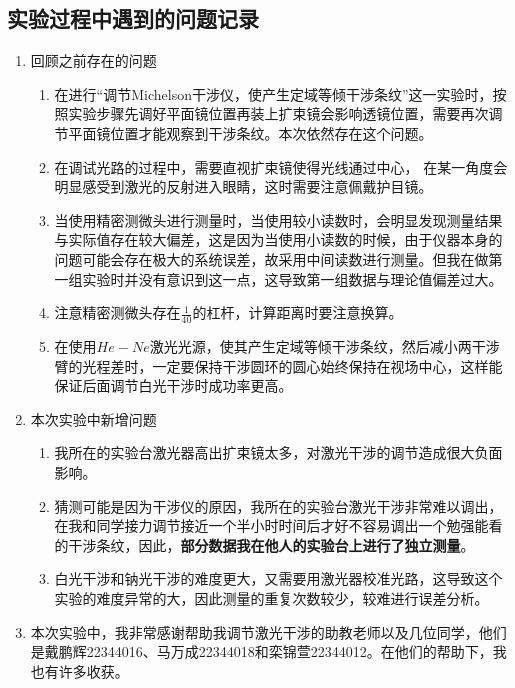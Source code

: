 \documentclass[dvipsnames, svgnames,a4paper,11pt]{article}
\begin{document}
	\subsection{实验过程中遇到的问题记录}
	\begin{enumerate}
		\item 回顾之前存在的问题
		\begin{enumerate}
			\item 在进行“调节Michelson干涉仪，使产生定域等倾干涉条纹”这一实验时，按照实验步骤先调好平面镜位置再装上扩束镜会影响透镜位置，需要再次调节平面镜位置才能观察到干涉条纹。本次依然存在这个问题。
			\item 在调试光路的过程中，需要直视扩束镜使得光线通过中心，
			在某一角度会明显感受到激光的反射进入眼睛，这时需要注意佩戴护目镜。
			\item 当使用精密测微头进行测量时，当使用较小读数时，会明显发现测量结果与实际值存在较大偏差，这是因为当使用小读数的时候，由于仪器本身的问题可能会存在极大的系统误差，故采用中间读数进行测量。但我在做第一组实验时并没有意识到这一点，这导致第一组数据与理论值偏差过大。
			\item 注意精密测微头存在$\frac{1}{40}$的杠杆，计算距离时要注意换算。			
			\item 在使用$He-Ne$激光光源，使其产生定域等倾干涉条纹，然后减小两干涉臂的光程差时，一定要保持干涉圆环的圆心始终保持在视场中心，这样能保证后面调节白光干涉时成功率更高。
		\end{enumerate}
		\item 本次实验中新增问题
		\begin{enumerate}
			\item 我所在的实验台激光器高出扩束镜太多，对激光干涉的调节造成很大负面影响。
			\item 猜测可能是因为干涉仪的原因，我所在的实验台激光干涉非常难以调出，在我和同学接力调节接近一个半小时时间后才好不容易调出一个勉强能看的干涉条纹，因此，\textbf{部分数据我在他人的实验台上进行了独立测量}。
			\item 白光干涉和钠光干涉的难度更大，又需要用激光器校准光路，这导致这个实验的难度异常的大，因此测量的重复次数较少，较难进行误差分析。
		\end{enumerate}
		\item 本次实验中，我非常感谢帮助我调节激光干涉的助教老师以及几位同学，他们是戴鹏辉22344016、马万成22344018和栾锦萱22344012。在他们的帮助下，我也有许多收获。
	\end{enumerate}
	
	
	
	\clearpage
	
\end{document}

